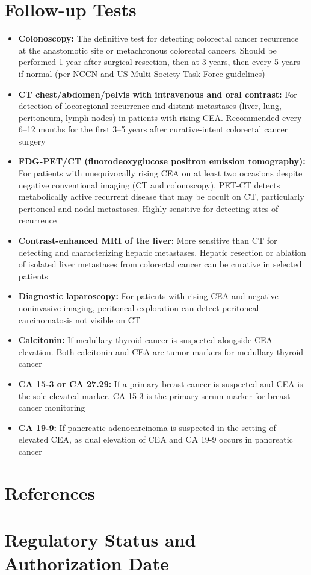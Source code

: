 \section*{Follow-up Tests}
\begin{itemize}
  \item \textbf{Colonoscopy:} The definitive test for detecting colorectal cancer recurrence at the anastomotic site or metachronous colorectal cancers. Should be performed 1 year after surgical resection, then at 3 years, then every 5 years if normal (per NCCN and US Multi-Society Task Force guidelines)
  \item \textbf{CT chest/abdomen/pelvis with intravenous and oral contrast:} For detection of locoregional recurrence and distant metastases (liver, lung, peritoneum, lymph nodes) in patients with rising CEA. Recommended every 6--12 months for the first 3--5 years after curative-intent colorectal cancer surgery
  \item \textbf{FDG-PET/CT (fluorodeoxyglucose positron emission tomography):} For patients with unequivocally rising CEA on at least two occasions despite negative conventional imaging (CT and colonoscopy). PET-CT detects metabolically active recurrent disease that may be occult on CT, particularly peritoneal and nodal metastases. Highly sensitive for detecting sites of recurrence
  \item \textbf{Contrast-enhanced MRI of the liver:} More sensitive than CT for detecting and characterizing hepatic metastases. Hepatic resection or ablation of isolated liver metastases from colorectal cancer can be curative in selected patients
  \item \textbf{Diagnostic laparoscopy:} For patients with rising CEA and negative noninvasive imaging, peritoneal exploration can detect peritoneal carcinomatosis not visible on CT
  \item \textbf{Calcitonin:} If medullary thyroid cancer is suspected alongside CEA elevation. Both calcitonin and CEA are tumor markers for medullary thyroid cancer
  \item \textbf{CA 15-3 or CA 27.29:} If a primary breast cancer is suspected and CEA is the sole elevated marker. CA 15-3 is the primary serum marker for breast cancer monitoring
  \item \textbf{CA 19-9:} If pancreatic adenocarcinoma is suspected in the setting of elevated CEA, as dual elevation of CEA and CA 19-9 occurs in pancreatic cancer
\end{itemize}

\section*{References}



\clearpage
\section*{Regulatory Status and Authorization Date}

\clearpage

